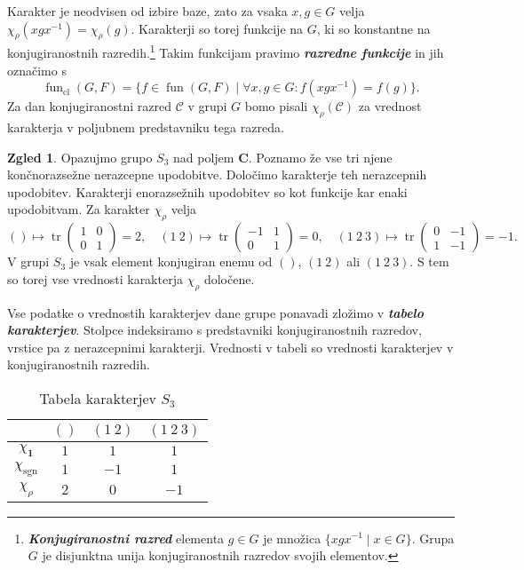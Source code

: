 \documentclass[11pt]{book}
\def\CC{\mathbf{C}}
\def\conclass{\mathcal{C}}
\def\11{\mathbf{1}}
\DeclareMathOperator\sgn{sgn}
\DeclareMathOperator\tr{tr}
\DeclareMathOperator\cl{cl}
\DeclareMathOperator\fun{fun}
\def\definicija{\color{rdeca}\bf\em}
\theoremstyle{definition}
\theoremstyle{zgled}
\newtheorem*{zgled}{Zgled}
\theoremstyle{odprtproblem}
\theoremstyle{domacanaloga}
\theoremstyle{izrek}
\begin{document}
Karakter je neodvisen od izbire baze, zato za vsaka $x, g \in G$ velja $\chi_{\rho}(x g x^{-1}) = \chi_{\rho}(g)$. Karakterji so torej funkcije na $G$, ki so konstantne na konjugiranostnih razredih.\footnote{{\definicija Konjugiranostni razred} elementa $g \in G$ je množica $\{ x g x^{-1} \mid x \in G \}$. Grupa $G$ je disjunktna unija konjugiranostnih razredov svojih elementov.} Takim funkcijam pravimo {\definicija razredne funkcije} in jih označimo s
\[
    \fun_{\cl}(G,F) = \{ f \in \fun(G,F) \mid \forall x, g \in G \colon f(x g x^{-1}) = f(g) \}.
\]
Za dan konjugiranostni razred $\conclass$ v grupi $G$ bomo pisali $\chi_{\rho}(\conclass)$ za vrednost karakterja v poljubnem predstavniku tega razreda.

\begin{zgled}
Opazujmo grupo $S_3$ nad poljem $\CC$. Poznamo že vse tri njene končnorazsežne nerazcepne upodobitve. Določimo karakterje teh nerazcepnih upodobitev. Karakterji enorazsežnih upodobitev so kot funkcije kar enaki upodobitvam. Za karakter $\chi_{\rho}$ velja
\[
    () \mapsto \tr \begin{pmatrix}
        1 & 0 \\ 0 & 1
    \end{pmatrix} = 2, \quad
    (1 \ 2) \mapsto \tr \begin{pmatrix}
        -1 & 1 \\ 0 & 1
    \end{pmatrix} = 0, \quad
    (1 \ 2 \ 3) \mapsto \tr \begin{pmatrix}
        0 & -1 \\ 1 & -1
    \end{pmatrix} = -1.
\]
V grupi $S_3$ je vsak element konjugiran enemu od $()$, $(1 \ 2)$ ali $(1 \ 2 \ 3)$. S tem so torej vse vrednosti karakterja $\chi_{\rho}$ določene.

Vse podatke o vrednostih karakterjev dane grupe ponavadi zložimo v {\definicija tabelo karakterjev}. Stolpce indeksiramo s predstavniki konjugiranostnih razredov, vrstice pa z nerazcepnimi karakterji. Vrednosti v tabeli so vrednosti karakterjev v konjugiranostnih razredih.

\begin{table}[t]
     \centering
\begin{tabular}{c|ccc}
     & $()$ & $(1 \ 2)$ & $(1 \ 2 \ 3)$ \\ \hline
     $\chi_{\11}$ & $1$ & $1$ & $1$ \\
     $\chi_{\sgn}$ & $1$ & $-1$ & $1$ \\
     $\chi_{\rho}$ & $2$ & $0$ & $-1$ \\
\end{tabular}
\caption{Tabela karakterjev $S_3$}
\end{table}
\end{zgled}
\end{document}
